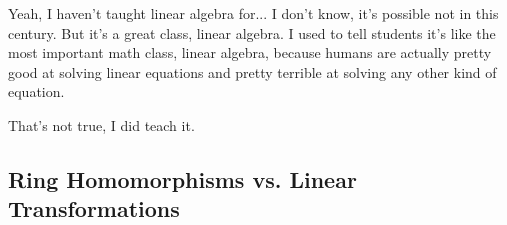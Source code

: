 \begin{speech}[00:20:12 - 00:21:10]
Yeah, I haven't taught linear algebra for... I don't know, it's possible not in this century. But it's a great class, linear algebra. I used to tell students it's like the most important math class, linear algebra, because humans are actually pretty good at solving linear equations and pretty terrible at solving any other kind of equation.

That's not true, I did teach it. 
\end{speech}

\subsection{Ring Homomorphisms vs. Linear Transformations}

